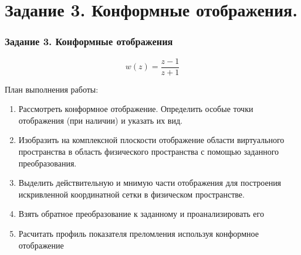 \section{Задание 3. Конформные отображения.}
\begin{frame}\frametitle{Задание 3. Конформные отображения}
\[ w(z) = \frac{z-1}{z+1} \]

План выполнения работы:
\begin{enumerate}
  \item Рассмотреть конформное отображение. 
  Определить особые точки отображения (при наличии) и указать их вид.

  \item Изобразить на комплексной плоскости отображение
  области виртуального пространства в область физического пространства
  с помощью заданного преобразования. 

  \item Выделить действительную и мнимую части отображения
  для построения искривленной координатной сетки в физическом пространстве.

  \item Взять обратное преобразование к заданному и проанализировать его
  
  \item Расчитать профиль показателя преломления используя конформное отображение

\end{enumerate}
\end{frame}
